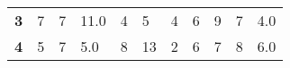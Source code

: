{\begin{tabular}{ c | *{5}{>{\centering\arraybackslash}p{3cm}}}
 { \textbf{3}} & { 7}                                                                                                      & { 7}                                                                                            & { 11.0}                                                                                  & { 4}                                                                                                            & { 5}                                                                                                                    & { 4}                                                                                                      & { 6}                                                                                                             & { 9}                                                                                           & { 7}                                                                                          & { 4.0}                                                                                                                        \\
 { \textbf{4}} & { 5}                                                                                                      & { 7}                                                                                            & { 5.0}                                                                                   & { 8}                                                                                                            & { 13}                                                                                                                   & { 2}                                                                                                      & { 6}                                                                                                             & { 7}                                                                                           & { 8}                                                                                          & { 6.0}                                                                                                                        \\

\end{tabular}}
